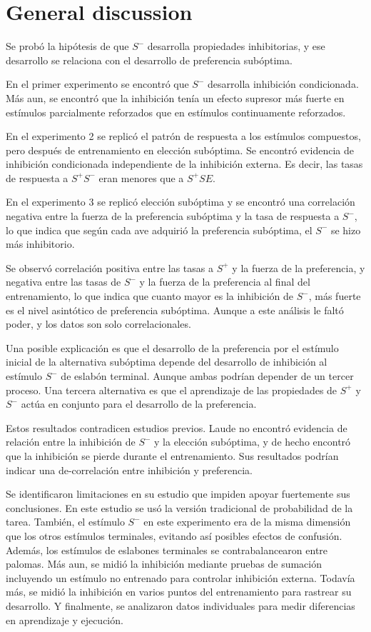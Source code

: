 \documentclass[a4paper,12pt]{article}
\begin{document}
\section{General discussion}

Se probó la hipótesis de que $S^{-}$ desarrolla propiedades inhibitorias, y ese desarrollo se relaciona con el desarrollo de preferencia subóptima.

En el primer experimento se encontró que $S^{-}$ desarrolla inhibición condicionada.
Más aun, se encontró que la inhibición tenía un efecto supresor más fuerte en estímulos parcialmente reforzados que en estímulos continuamente reforzados.

En el experimento 2 se replicó el patrón de respuesta a los estímulos compuestos, pero después de entrenamiento en elección subóptima.
Se encontró evidencia de inhibición condicionada independiente de la inhibición externa.
Es decir, las tasas de respuesta a $S^{+}S^{-}$ eran menores que a $S^{+}SE$.

En el experimento 3 se replicó elección subóptima y se encontró una correlación negativa entre la fuerza de la preferencia subóptima y la tasa de respuesta a $S^{-}$, lo que indica que según cada ave adquirió la preferencia subóptima, el $S^{-}$ se hizo más inhibitorio.

Se observó correlación positiva entre las tasas a $S^{+}$ y la fuerza de la preferencia, y negativa entre las tasas de $S^{-}$ y la fuerza de la preferencia al final del entrenamiento, lo que indica que cuanto mayor es la inhibición de $S^{-}$, más fuerte es el nivel asintótico de preferencia subóptima.
Aunque a este análisis le faltó poder, y los datos son solo correlacionales.

Una posible explicación es que el desarrollo de la preferencia por el estímulo inicial de la alternativa subóptima depende del desarrollo de inhibición al estímulo $S^{-}$ de eslabón terminal.
Aunque ambas podrían depender de un tercer proceso.
Una tercera alternativa es que el aprendizaje de las propiedades de $S^{+}$ y $S^{-}$ actúa en conjunto para el desarrollo de la preferencia.

Estos resultados contradicen estudios previos.
Laude no encontró evidencia de relación entre la inhibición de $S^{-}$ y la elección subóptima, y de hecho encontró que  la inhibición se pierde durante el entrenamiento.
Sus resultados podrían indicar una de-correlación entre inhibición y preferencia.

Se identificaron limitaciones en su estudio que impiden apoyar fuertemente sus conclusiones.
En este estudio se usó la versión tradicional de probabilidad de la tarea.
También, el estímulo $S^{-}$ en este experimento era de la misma dimensión que los otros estímulos terminales, evitando así posibles efectos de confusión.
Además, los estímulos de eslabones terminales se contrabalancearon entre palomas.
Más aun, se midió la inhibición mediante pruebas de sumación incluyendo un estímulo no entrenado para controlar inhibición externa. Todavía más, se midió la inhibición en varios puntos del entrenamiento para rastrear su desarrollo.
Y finalmente, se analizaron datos individuales para medir diferencias en aprendizaje y ejecución.
\end{document}
